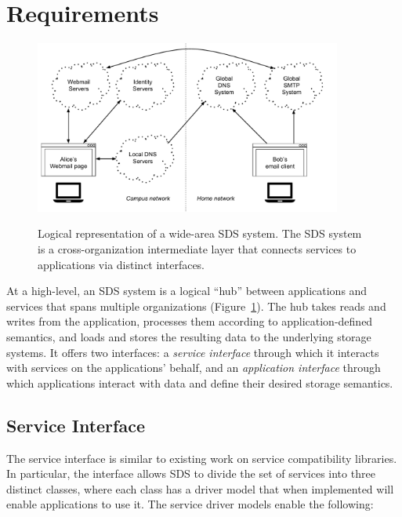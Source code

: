 \section{Requirements}

\begin{figure}[h]
   \caption{Logical representation of a wide-area SDS system.  The SDS system
   is a cross-organization intermediate layer that connects services to
   applications via distinct interfaces.}
   \centering
   \includegraphics[width=0.9\textwidth,page=2]{figures/dissertation-figures}
   \label{fig:chap2-sds-overview}
\end{figure}

At a high-level, an SDS system is a logical ``hub'' between applications and
services that spans multiple organizations (Figure~\ref{fig:chap2-sds-overview}). 
The hub takes reads and writes from the application, processes them
according to application-defined semantics, and loads and stores the resulting
data to the underlying storage systems.
It offers two interfaces:  a \emph{service interface} through which it interacts with
services on the applications' behalf, and an \emph{application interface} through
which applications interact with data and define their desired storage
semantics.

\subsection{Service Interface}

The service interface is similar to existing work on service compatibility
libraries.  In particular, the interface allows SDS to divide the set of
services into three distinct classes, where each class has a driver model that
when implemented will enable applications to use it.  The service driver models
enable the following:

